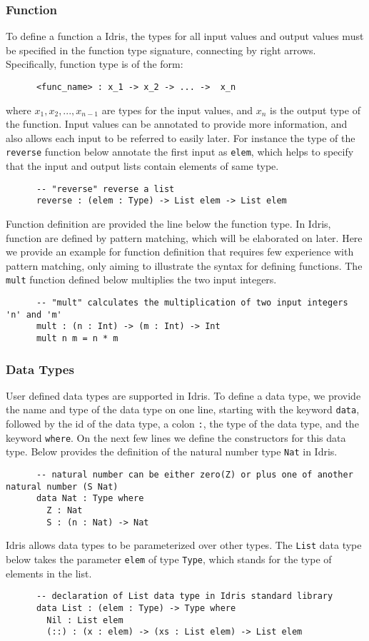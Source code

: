 \subsubsection*{Function}
To define a function a Idris, the types for all input values and output values must be specified in the function type signature, connecting by right arrows. Specifically, function type is of the form: 
\begin{lstlisting}
      <func_name> : x_1 -> x_2 -> ... ->  x_n
\end{lstlisting}
where $x_1, x_2, ..., x_{n-1}$ are types for the input values, and $x_n$ is the output type of the function. Input values can be annotated to provide more information, and also allows each input to be referred to easily later. For instance the type of the \texttt{reverse} function below annotate the first input as \texttt{elem}, which helps to specify that the input and output lists contain elements of same type. 
\begin{lstlisting}
      -- "reverse" reverse a list
      reverse : (elem : Type) -> List elem -> List elem
\end{lstlisting}
Function definition are provided the line below the function type. In Idris, function are defined by pattern matching, which will be elaborated on later. Here we provide an example for function definition that requires few experience with pattern matching, only aiming to illustrate the syntax for defining functions. The \texttt{mult} function defined below multiplies the two input integers. 
\begin{lstlisting}
      -- "mult" calculates the multiplication of two input integers 'n' and 'm'
      mult : (n : Int) -> (m : Int) -> Int
      mult n m = n * m
\end{lstlisting}

\subsubsection*{Data Types}
User defined data types are supported in Idris. To define a data type, we provide the name and type of the data type on one line, starting with the keyword \texttt{data}, followed by the id of the data type, a colon \texttt{:}, the type of the data type, and the keyword \texttt{where}. On the next few lines we define the constructors for this data type. Below provides the definition of the natural number type \texttt{Nat} in Idris. 
\begin{lstlisting}
      -- natural number can be either zero(Z) or plus one of another natural number (S Nat)
      data Nat : Type where
        Z : Nat
        S : (n : Nat) -> Nat 
\end{lstlisting}
Idris allows data types to be parameterized over other types. The \texttt{List} data type below takes the parameter \texttt{elem} of type \texttt{Type}, which stands for the type of elements in the list. 
 \begin{lstlisting}
      -- declaration of List data type in Idris standard library
      data List : (elem : Type) -> Type where
        Nil : List elem
        (::) : (x : elem) -> (xs : List elem) -> List elem
\end{lstlisting}



